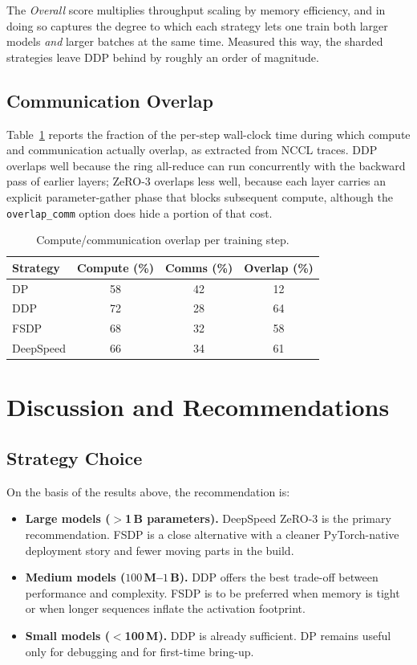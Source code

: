 The \emph{Overall} score multiplies throughput scaling by memory
efficiency, and in doing so captures the degree to which each
strategy lets one train both larger models \emph{and} larger
batches at the same time. Measured this way, the sharded
strategies leave DDP behind by roughly an order of magnitude.

\subsection{Communication Overlap}\label{sec:res_overlap}
Table~\ref{tab:overlap} reports the fraction of the per-step
wall-clock time during which compute and communication actually
overlap, as extracted from NCCL traces. DDP overlaps well because
the ring all-reduce can run concurrently with the backward pass of
earlier layers; ZeRO-3 overlaps less well, because each layer
carries an explicit parameter-gather phase that blocks subsequent
compute, although the \texttt{overlap\_comm} option does hide a
portion of that cost.

\begin{table}[h]
\centering
\caption{Compute/communication overlap per training step.}
\label{tab:overlap}
\begin{tabular}{lccc}
\toprule
\textbf{Strategy} & \textbf{Compute (\%)} & \textbf{Comms (\%)} & \textbf{Overlap (\%)} \\
\midrule
DP              & 58 & 42 & 12 \\
DDP             & 72 & 28 & 64 \\
FSDP            & 68 & 32 & 58 \\
DeepSpeed       & 66 & 34 & 61 \\
\bottomrule
\end{tabular}
\end{table}

\section{Discussion and Recommendations}\label{sec:dist_discussion}

\subsection{Strategy Choice}\label{sec:dist_choice}
On the basis of the results above, the recommendation is:
\begin{itemize}
    \item \textbf{Large models ($>$1\,B parameters).} DeepSpeed
          ZeRO-3 is the primary recommendation. FSDP is a close
          alternative with a cleaner PyTorch-native deployment
          story and fewer moving parts in the build.
    \item \textbf{Medium models ($100$\,M--$1$\,B).} DDP offers
          the best trade-off between performance and complexity.
          FSDP is to be preferred when memory is tight or when
          longer sequences inflate the activation footprint.
    \item \textbf{Small models ($<$100\,M).} DDP is already
          sufficient. DP remains useful only for debugging and
          for first-time bring-up.
\end{itemize}

